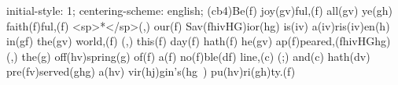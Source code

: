 initial-style: 1;
centering-scheme: english;
(cb4)Be(f) joy(gv)ful,(f) all(gv) ye(gh) faith(f)ful,(f) <sp>*</sp>(,) our(f) Sav(fhivHG)ior(hg) is(iv) a(iv)ris(iv)en(h) in(gf) the(gv) world,(f) (,) this(f) day(f) hath(f) he(gv) ap(f)peared,(fhivHGhg) (,) the(g) off(hv)spring(g) of(f) a(f) no(f)ble(df) line,(c) (;) and(c) hath(dv) pre(fv)served(ghg) a(hv) vir(hj)gin's(hg~) pu(hv)ri(gh)ty.(f)
